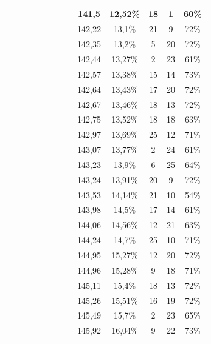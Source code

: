 \begin{center}
\begin{longtable}{|c|c|c|c|c|c|c|c|c|c|c|c|c|}
 \x &  &  &  &  \x &  &  &  \x & 141,5 & 12,52\% & 18 & 1 & 60\% \\ \hline
 \x &  &  &  &  \x &  \x &  &  \x & 142,22 & 13,1\% & 21 & 9 & 72\% \\ \hline
 \x &  \x &  \x &  \x &  &  \x &  \x &  \x & 142,35 & 13,2\% & 5 & 20 & 72\% \\ \hline
 \x &  \x &  &  \x &  \x &  &  &  \x & 142,44 & 13,27\% & 2 & 23 & 61\% \\ \hline
 \x &  \x &  \x &  &  &  \x &  \x &  \x & 142,57 & 13,38\% & 15 & 14 & 73\% \\ \hline
 \x &  \x &  &  \x &  &  \x &  &  \x & 142,64 & 13,43\% & 17 & 20 & 72\% \\ \hline
 \x &  &  \x &  &  &  \x &  &  \x & 142,67 & 13,46\% & 18 & 13 & 72\% \\ \hline
 \x &  \x &  \x &  &  \x &  &  &  \x & 142,75 & 13,52\% & 18 & 18 & 63\% \\ \hline
 \x &  &  \x &  \x &  \x &  \x &  &  \x & 142,97 & 13,69\% & 25 & 12 & 71\% \\ \hline
 \x &  \x &  &  &  \x &  &  &  \x & 143,07 & 13,77\% & 2 & 24 & 61\% \\ \hline
 \x &  \x &  \x &  &  &  &  \x &  \x & 143,23 & 13,9\% & 6 & 25 & 64\% \\ \hline
 \x &  &  \x &  \x &  &  \x &  &  \x & 143,24 & 13,91\% & 20 & 9 & 72\% \\ \hline
 \x &  \x &  &  \x &  &  &  &  \x & 143,53 & 14,14\% & 21 & 10 & 54\% \\ \hline
 \x &  \x &  &  &  \x &  &  &  \x & 143,98 & 14,5\% & 17 & 14 & 61\% \\ \hline
 \x &  \x &  \x &  &  \x &  &  &  \x & 144,06 & 14,56\% & 12 & 21 & 63\% \\ \hline
 \x &  \x &  \x &  &  &  \x &  \x &  \x & 144,24 & 14,7\% & 25 & 10 & 71\% \\ \hline
 \x &  &  &  \x &  \x &  \x &  &  \x & 144,95 & 15,27\% & 12 & 20 & 72\% \\ \hline
 \x &  \x &  \x &  &  \x &  \x &  &  \x & 144,96 & 15,28\% & 9 & 18 & 71\% \\ \hline
 \x &  &  &  &  &  \x &  &  \x & 145,11 & 15,4\% & 18 & 13 & 72\% \\ \hline
 \x &  \x &  &  \x &  \x &  \x &  &  \x & 145,26 & 15,51\% & 16 & 19 & 72\% \\ \hline
 \x &  \x &  \x &  \x &  &  &  &  \x & 145,49 & 15,7\% & 2 & 23 & 65\% \\ \hline
 \x &  &  \x &  &  \x &  \x &  \x &  \x & 145,92 & 16,04\% & 9 & 22 & 73\% \\ \hline

\end{longtable}
\end{center}
